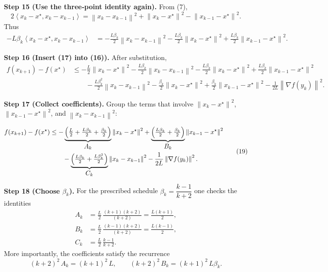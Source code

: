 \documentclass{article}
\newcommand{\norm}[1]{\left\lVert#1\right\rVert}
\newcommand{\ip}[2]{\left\langle #1,#2\right\rangle}
\begin{document}
\bigskip
\noindent\textbf{Step 15 (Use the three‑point identity again).} From (7),
\[
2\ip{x_k-x^\star}{x_k-x_{k-1}}
   = \norm{x_k-x_{k-1}}^2 + \norm{x_k-x^\star}^2 - \norm{x_{k-1}-x^\star}^2 .
\]
Thus
\[
\begin{aligned}
-L\beta_k\ip{x_k-x^\star}{x_k-x_{k-1}}
   &= -\frac{L\beta_k}{2}\norm{x_k-x_{k-1}}^2
      -\frac{L\beta_k}{2}\norm{x_k-x^\star}^2
      +\frac{L\beta_k}{2}\norm{x_{k-1}-x^\star}^2 .
\end{aligned}
\tag{17}
\]

\bigskip
\noindent\textbf{Step 16 (Insert (17) into (16)).} After substitution,
\[
\begin{aligned}
f(x_{k+1})-f(x^\star)
 &\le -\frac{L}{2}\norm{x_k-x^\star}^2
      -\frac{L\beta_k}{2}\norm{x_k-x_{k-1}}^2
      -\frac{L\beta_k}{2}\norm{x_k-x^\star}^2
      +\frac{L\beta_k}{2}\norm{x_{k-1}-x^\star}^2 \\
 &\qquad -\frac{L\beta_k^2}{2}\norm{x_k-x_{k-1}}^2
      -\frac{\beta_k}{2}\norm{x_k-x^\star}^2
      +\frac{\beta_k}{2}\norm{x_{k-1}-x^\star}^2
      -\frac{1}{2L}\norm{\nabla f(y_k)}^2 .
\end{aligned}
\tag{18}
\]

\bigskip
\noindent\textbf{Step 17 (Collect coefficients).} Group the terms that involve $\norm{x_k-x^\star}^2$, $\norm{x_{k-1}-x^\star}^2$, and $\norm{x_k-x_{k-1}}^2$:

\[
\begin{aligned}
f(x_{k+1})-f(x^\star)
 &\le -\underbrace{\Bigl(\tfrac{L}{2}+\tfrac{L\beta_k}{2}+\tfrac{\beta_k}{2}\Bigr)}_{\displaystyle A_k}
        \norm{x_k-x^\star}^2
   +\underbrace{\Bigl(\tfrac{L\beta_k}{2}+\tfrac{\beta_k}{2}\Bigr)}_{\displaystyle B_k}
        \norm{x_{k-1}-x^\star}^2 \\
 &\qquad -\underbrace{\Bigl(\tfrac{L\beta_k}{2}+\tfrac{L\beta_k^2}{2}\Bigr)}_{\displaystyle C_k}
        \norm{x_k-x_{k-1}}^2
   -\frac{1}{2L}\norm{\nabla f(y_k)}^2 .
\end{aligned}
\tag{19}
\]

\bigskip
\noindent\textbf{Step 18 (Choose $\beta_k$).} For the prescribed schedule $\beta_k=\dfrac{k-1}{k+2}$ one checks the identities
\[
\begin{aligned}
A_k &= \frac{L}{2}\,\frac{(k+1)(k+2)}{(k+2)} = \frac{L(k+1)}{2},\\
B_k &= \frac{L}{2}\,\frac{(k-1)(k+2)}{(k+2)} = \frac{L(k-1)}{2},\\
C_k &= \frac{L}{2}\,\frac{k-1}{k+2}.
\end{aligned}
\tag{20}
\]
More importantly, the coefficients satisfy the recurrence
\[
(k+2)^2\,A_k = (k+1)^2\,L ,\qquad
(k+2)^2\,B_k = (k+1)^2\,L\beta_k .
\tag{21}
\]
\end{document}

